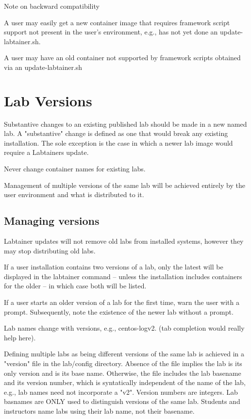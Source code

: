 Note on backward compatibility

A user may easily get a new container image that requires framework
script support not present in the user's environment, e.g., has
not yet done an update-labtainer.sh.  

A user may have an old container not supported by framework scripts
obtained via an update-labtainer.sh

\section{Lab Versions}
Substantive changes to an existing published lab should be made in
a new named lab.  A "substantive" change is defined as one that would
break any existing installation.  The sole exception is the case in 
which a newer lab image would require a Labtainers update.

Never change container names for existing labs.

Management of multiple versions of the same lab will be achieved entirely
by the user environment and what is distributed to it.

\subsection{Managing versions}
Labtainer updates will not remove old labs from installed systems, however 
they may stop distributing old labs.

If a user installation contains two versions of a lab, only the latest will
be displayed in the labtainer command -- unless the installation includes
containers for the older -- in which case both will be listed.

If a user starts an older version of a lab for the first time, warn the user
with a prompt.  Subsequently, note the existence of the newer lab without a prompt.

Lab names change with versions, e.g., centos-logv2.  (tab completion would really
help here).

Defining multiple labs as being different versions of the same lab is achieved
in a "version" file in the lab/config directory.  Absence of the file implies the
lab is its only version and is its base name. Otherwise, the file includes the 
lab basename and its version number, which is syntatically independent of the name
of the lab, e.g., lab names need not incorporate a "v2".  Version numbers are integers.
Lab basnames are ONLY used to distinguish versions of the same lab.   Students and
instructors name labs using their lab name, not their basename.


